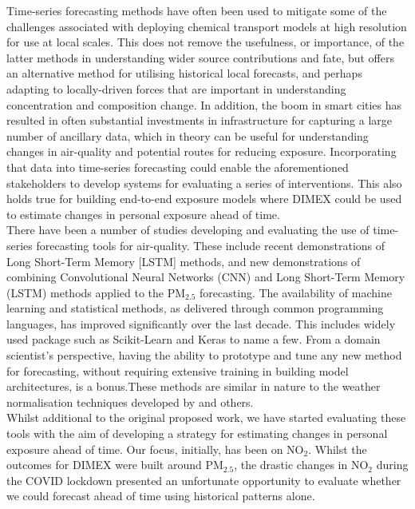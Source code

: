 \documentclass{article}
\begin{document}
Time-series forecasting methods have often been used to mitigate some of the challenges associated with deploying chemical transport models at high resolution for use at local scales. This does not remove the usefulness, or importance, of the latter methods in understanding wider source contributions and fate, but offers an alternative method for utilising historical local forecasts, and perhaps adapting to locally-driven forces that are important in understanding concentration and composition change. In addition, the boom in smart cities has resulted in often substantial investments in infrastructure for capturing a large number of ancillary data, which in theory can be useful for understanding changes in air-quality and potential routes for reducing exposure. Incorporating that data into time-series forecasting could enable the aforementioned stakeholders to develop systems for evaluating a series of interventions. This also holds true for building end-to-end exposure models where DIMEX could be used to estimate changes in personal exposure ahead of time. \\

\noindent There have been a number of studies developing and evaluating the use of time-series forecasting tools for air-quality. These include recent demonstrations of Long Short-Term Memory [LSTM] methods, and new demonstrations of combining Convolutional Neural Networks (CNN) and Long Short-Term Memory (LSTM) methods applied to the PM$_{2.5}$ forecasting. The availability of machine learning and statistical methods, as delivered through common programming languages, has improved significantly over the last decade. This includes widely used package such as Scikit-Learn and Keras to name a few. From a domain scientist's perspective, having the ability to prototype and tune any new method for forecasting, without requiring extensive training in building model architectures, is a bonus.These methods are similar in nature to the weather normalisation techniques developed by and others.\\

\noindent Whilst additional to the original proposed work, we have started evaluating these tools with the aim of developing a strategy for estimating changes in personal exposure ahead of time. Our focus, initially, has been on NO$_{2}$. Whilst the outcomes for DIMEX were built around PM$_{2.5}$, the drastic changes in NO$_{2}$ during the COVID lockdown presented an unfortunate opportunity to evaluate whether we could forecast ahead of time using historical patterns alone.\\
\end{document}
